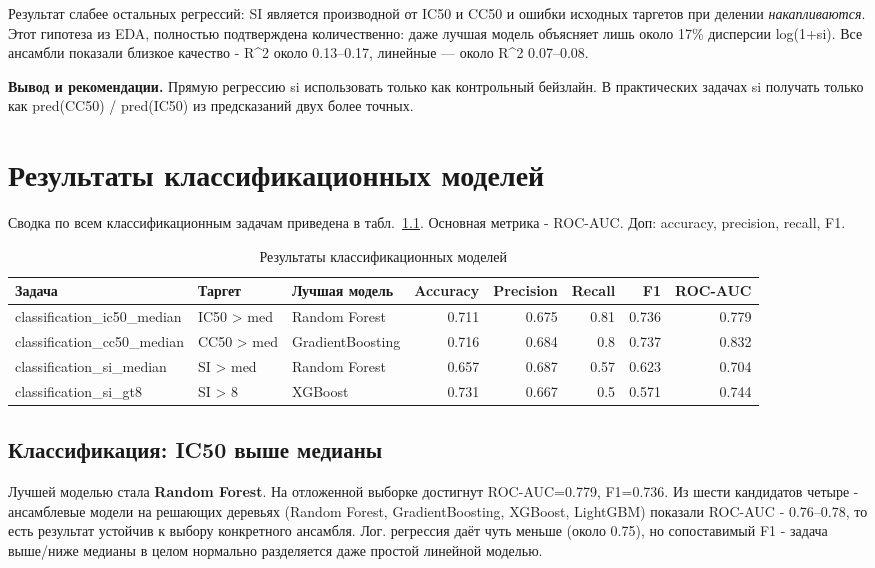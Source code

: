 \documentclass[12pt,a4paper]{report}
\begin{document}
Результат слабее остальных регрессий: SI является производной от IC50 и CC50 и ошибки исходных таргетов при делении \emph{ накапливаются}. Этот гипотеза из EDA, полностью подтверждена  количественно: даже лучшая модель объясняет лишь около 17\% дисперсии log(1+si). Все ансамбли показали близкое качество - R\^{}2 около 0.13--0.17, линейные --- около R\^{}2 0.07--0.08.

\textbf{Вывод и рекомендации.} Прямую регрессию si использовать только как контрольный бейзлайн. В практических задачах si получать только как pred(CC50) / pred(IC50) из предсказаний двух более точных.

\chapter{Результаты классификационных моделей}

Сводка по всем классификационным задачам приведена в табл.~\ref{tab:clf_summary}. Основная метрика - ROC-AUC. Доп: accuracy, precision, recall, F1.

\begin{table}[H]
\centering
\caption{Результаты классификационных моделей }
\label{tab:clf_summary}
\small
\begin{tabular}{lllrrrrr}
\toprule
Задача & Таргет & Лучшая модель & Accuracy & Precision & Recall & F1 & ROC-AUC \\
\midrule
classification\_ic50\_median & IC50 > med   & Random Forest    & 0.711 & 0.675 & 0.81 & 0.736 & 0.779 \\
classification\_cc50\_median & CC50 > med   & GradientBoosting & 0.716 & 0.684 & 0.8 & 0.737 & 0.832 \\
classification\_si\_median   & SI > med     & Random Forest    & 0.657 & 0.687 & 0.57 & 0.623 & 0.704 \\
classification\_si\_gt8      & SI > 8       & XGBoost          & 0.731 & 0.667 & 0.5 & 0.571 & 0.744 \\
\bottomrule
\end{tabular}
\end{table}

\section{Классификация: IC50 выше медианы}

Лучшей моделью стала \textbf{Random Forest}. На отложенной выборке достигнут ROC-AUC=0.779, F1=0.736. Из шести кандидатов четыре - ансамблевые модели на решающих деревьях (Random Forest, GradientBoosting, XGBoost, LightGBM) показали ROC-AUC - 0.76--0.78, то есть результат устойчив к выбору конкретного ансамбля. Лог. регрессия даёт чуть меньше (около 0.75), но сопоставимый F1 - задача выше/ниже медианы в целом нормально разделяется даже простой линейной моделью.
\end{document}
